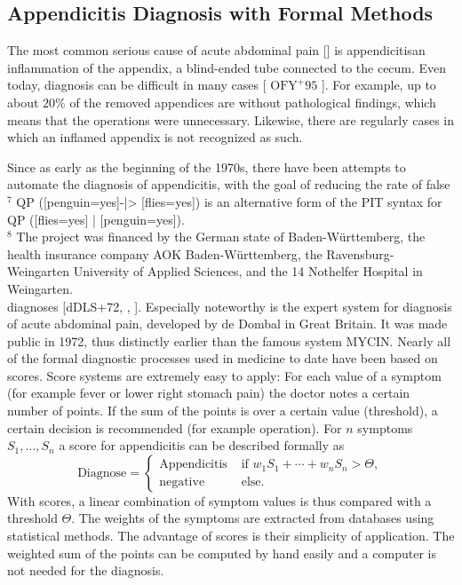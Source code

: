 \documentclass[10pt]{book}
\begin{document}
\subsection{Appendicitis Diagnosis with Formal Methods}
The most common serious cause of acute abdominal pain [\cite{dedombal1991diagnosis}] is appendicitisan inflammation of the appendix, a blind-ended tube connected to the cecum. Even today, diagnosis can be difficult in many cases [ $\mathrm{OFY}^{+} 95$ ]. For example, up to about $20 \%$ of the removed appendices are without pathological findings, which means that the operations were unnecessary. Likewise, there are regularly cases in which an inflamed appendix is not recognized as such.

Since as early as the beginning of the 1970s, there have been attempts to automate the diagnosis of appendicitis, with the goal of reducing the rate of false\\
${ }^{7}$ QP ([penguin=yes]-|> [flies=yes]) is an alternative form of the PIT syntax for QP ([flies=yes] | [penguin=yes]).\\
${ }^{8}$ The project was financed by the German state of Baden-Württemberg, the health insurance company AOK Baden-Württemberg, the Ravensburg-Weingarten University of Applied Sciences, and the 14 Nothelfer Hospital in Weingarten.\\[0pt]
diagnoses [dDLS+72, \cite{ohmann1994computerunterstuetze}, \cite{ohmann1995diagnosescore}]. Especially noteworthy is the expert system for diagnosis of acute abdominal pain, developed by de Dombal in Great Britain. It was made public in 1972, thus distinctly earlier than the famous system MYCIN.
Nearly all of the formal diagnostic processes used in medicine to date have been based on scores. Score systems are extremely easy to apply: For each value of a symptom (for example fever or lower right stomach pain) the doctor notes a certain number of points. If the sum of the points is over a certain value (threshold), a certain decision is recommended (for example operation). For $n$ symptoms $S_{1}, \ldots, S_{n}$ a score for appendicitis can be described formally as
$$
\text{Diagnose}=\begin{cases}
\text{Appendicitis} & \text{ if } w_{1}S_{1}+\cdots+w_{n}S_{n}>\Theta,\\
\text{negative} & \text{ else.}
\end{cases}
$$
With scores, a linear combination of symptom values is thus compared with a threshold $\Theta$. The weights of the symptoms are extracted from databases using statistical methods. The advantage of scores is their simplicity of application. The weighted sum of the points can be computed by hand easily and a computer is not needed for the diagnosis.
\end{document}

